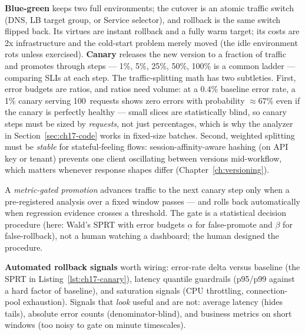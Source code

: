 \textbf{Blue-green} keeps two full environments; the cutover is an atomic
traffic switch (DNS, LB target group, or Service selector), and rollback
is the same switch flipped back. Its virtues are instant rollback and a
fully warm target; its costs are 2x infrastructure and the cold-start
problem merely moved (the idle environment rots unless exercised).
\textbf{Canary} releases the new version to a fraction of traffic and
promotes through steps --- 1\%, 5\%, 25\%, 50\%, 100\% is a common
ladder --- comparing SLIs at each step. The traffic-splitting math has
two subtleties. First, error budgets are ratios, and ratios need volume:
at a 0.4\% baseline error rate, a 1\% canary serving 100~requests shows
zero errors with probability $\approx 67\%$ even if the canary is
perfectly healthy --- small slices are statistically blind, so canary
steps must be sized by \emph{requests}, not just percentages, which is
why the analyzer in Section~\ref{sec:ch17-code} works in fixed-size
batches. Second, weighted splitting must be \emph{stable} for
stateful-feeling flows: session-affinity-aware hashing (on API key or
tenant) prevents one client oscillating between versions mid-workflow,
which matters whenever response shapes differ
(Chapter~\ref{ch:versioning}).

\begin{definition}
A \emph{metric-gated promotion} advances traffic to the next canary step
only when a pre-registered analysis over a fixed window passes --- and
rolls back automatically when regression evidence crosses a threshold.
The gate is a statistical decision procedure (here: Wald's SPRT with
error budgets $\alpha$ for false-promote and $\beta$ for false-rollback),
not a human watching a dashboard; the human designed the procedure.
\end{definition}

\textbf{Automated rollback signals} worth wiring: error-rate delta
versus baseline (the SPRT in Listing~\ref{lst:ch17-canary}), latency
quantile guardrails (p95/p99 against a hard factor of baseline), and
saturation signals (CPU throttling, connection-pool exhaustion). Signals
that \emph{look} useful and are not: average latency (hides tails),
absolute error counts (denominator-blind), and business metrics on short
windows (too noisy to gate on minute timescales).

